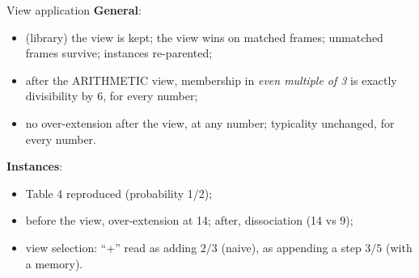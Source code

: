 \documentclass[aspectratio=169,11pt]{beamer}
\begin{document}
\begin{frame}{View application}
  \small
  \textbf{General}:
  \begin{itemize}
    \item (library) the view is kept; the view wins on matched frames; unmatched frames survive; instances re-parented;
    \item after the ARITHMETIC view, membership in \emph{even multiple of 3} is exactly divisibility by 6, for every number;
    \item no over-extension after the view, at any number; typicality unchanged, for every number.
  \end{itemize}
  \textbf{Instances}:
  \begin{itemize}
    \item Table 4 reproduced (probability 1/2);
    \item before the view, over-extension at 14; after, dissociation (14 vs 9);
    \item view selection: ``+'' read as adding $2/3$ (naive), as appending a step $3/5$ (with a memory).
  \end{itemize}
\end{frame}
\end{document}
